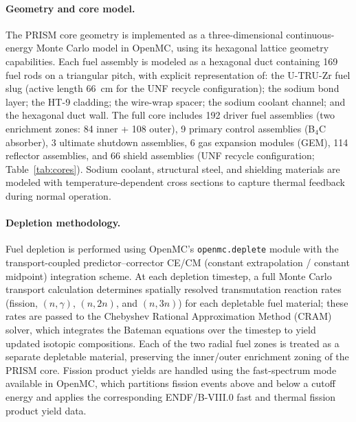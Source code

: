 \documentclass[10pt,twoside]{article}
\begin{document}
\paragraph{Geometry and core model.}
The PRISM core geometry is implemented as a three-dimensional
continuous-energy Monte Carlo model in OpenMC, using its hexagonal
lattice geometry capabilities.  Each fuel assembly is modeled as a hexagonal
duct containing 169 fuel rods on a triangular pitch, with explicit
representation of: the U-TRU-Zr fuel slug (active length 66~cm for
the UNF recycle configuration); the sodium bond layer; the HT-9
cladding; the wire-wrap spacer; the sodium coolant channel; and the
hexagonal duct wall.  The full core includes 192 driver fuel assemblies
(two enrichment zones: 84 inner + 108 outer), 9 primary control
assemblies (B$_4$C absorber), 3 ultimate shutdown assemblies, 6 gas
expansion modules (GEM), 114 reflector assemblies, and 66 shield
assemblies (UNF recycle configuration; Table~\ref{tab:cores}).
Sodium coolant, structural steel, and shielding materials are modeled
with temperature-dependent cross sections to capture thermal feedback
during normal operation.

\paragraph{Depletion methodology.}
Fuel depletion is performed using OpenMC's \texttt{openmc.deplete}
module with the transport-coupled predictor--corrector CE/CM
(constant extrapolation / constant midpoint) integration
scheme.\cite{Romano2021}  At each depletion timestep, a full Monte
Carlo transport calculation determines spatially resolved transmutation
reaction rates (fission, $(n,\gamma)$, $(n,2n)$, and $(n,3n)$) for
each depletable fuel material; these rates are passed to the Chebyshev
Rational Approximation Method (CRAM) solver, which integrates the
Bateman equations over the timestep to yield updated isotopic
compositions.  Each of the two radial fuel zones is treated as a
separate depletable material, preserving the inner/outer enrichment
zoning of the PRISM core.  Fission product yields are handled using
the fast-spectrum mode available in OpenMC, which partitions fission
events above and below a cutoff energy and applies the corresponding
ENDF/B-VIII.0 fast and thermal fission product yield data.
\end{document}
